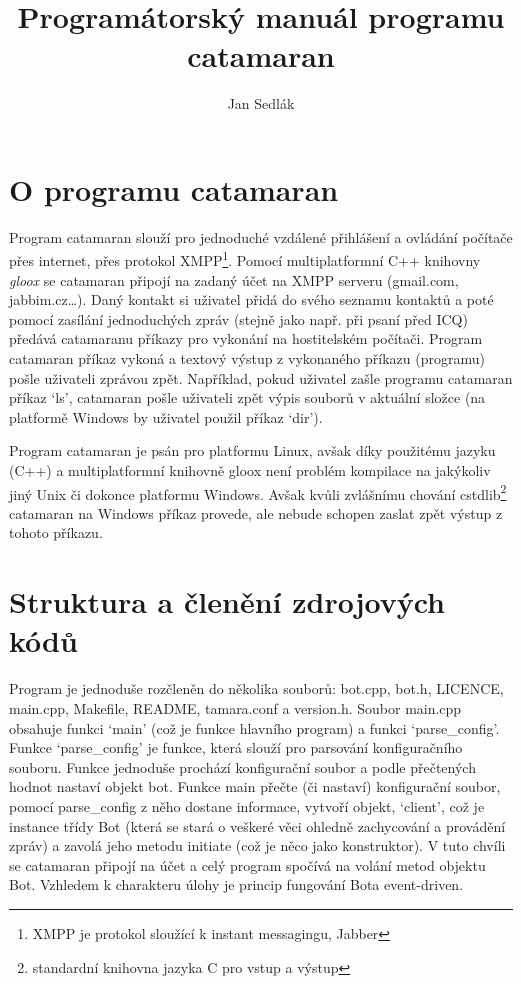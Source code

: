 \documentclass[a4paper,11pt,titlepage]{article}
\author{Jan Sedlák}
\title{Programátorský manuál programu catamaran}
\begin{document}
\maketitle
\tableofcontents
\newpage
\section{O programu catamaran}
Program catamaran slouží pro jednoduché vzdálené přihlášení a ovládání počítače přes internet, přes protokol XMPP\footnote{XMPP je protokol sloužící k instant messagingu, Jabber}.
Pomocí multiplatformní C++ knihovny \emph{gloox} se catamaran připojí na zadaný účet na XMPP serveru (gmail.com, jabbim.cz\ldots). Daný kontakt si uživatel přidá do svého seznamu kontaktů
a poté pomocí zasílání jednoduchých zpráv (stejně jako např. při psaní před ICQ) předává catamaranu příkazy pro vykonání na hostitelském počítači. Program catamaran příkaz vykoná
a textový výstup z vykonaného příkazu (programu) pošle uživateli zprávou zpět. Například, pokud uživatel zašle programu catamaran příkaz `ls', catamaran pošle uživateli zpět výpis
souborů v aktuální složce (na platformě Windows by uživatel použil příkaz `dir').

Program catamaran je psán pro platformu Linux, avšak díky použitému jazyku (C++) a multiplatformní knihovně gloox není problém kompilace na jakýkoliv jiný Unix či dokonce platformu Windows.
Avšak kvůli zvlášnímu chování cstdlib\footnote{standardní knihovna jazyka C pro vstup a výstup} catamaran na Windows příkaz provede, ale nebude schopen zaslat zpět výstup z tohoto příkazu.
\newpage
\section{Struktura a členění zdrojových kódů}
Program je jednoduše rozčleněn do několika souborů: bot.cpp, bot.h, LICENCE, main.cpp, Makefile, README, tamara.conf a version.h. Soubor main.cpp obsahuje funkci `main' (což je funkce hlavního
program) a funkci `parse\_config'. Funkce `parse\_config' je funkce, která slouží pro parsování konfiguračního souboru. Funkce jednoduše prochází konfigurační soubor a podle přečtených hodnot
nastaví objekt bot. Funkce main přečte (či nastaví) konfigurační soubor, pomocí parse\_config z něho dostane informace, vytvoří objekt, `client', což je instance třídy Bot (která se stará
o veškeré věci ohledně zachycování a provádění zpráv) a zavolá jeho metodu initiate (což je něco jako konstruktor). V tuto chvíli se catamaran připojí na účet a celý program spočívá na
volání metod objektu Bot. Vzhledem k charakteru úlohy je princip fungování Bota event-driven. 
\end{document}
